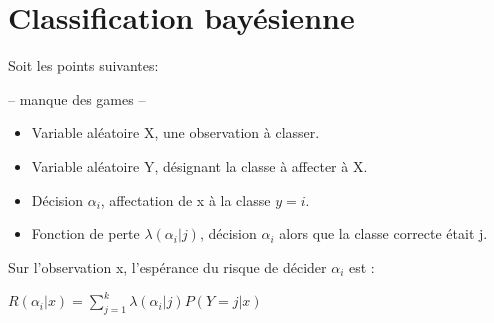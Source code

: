 \documentclass{article}
\begin{document}
\section{Classification bayésienne}

Soit les points suivantes:

-- manque des games --

\begin{itemize}
\item Variable aléatoire X, une observation à classer.
\item Variable aléatoire Y, désignant la classe à affecter à X.
\item Décision $\alpha_i$, affectation de x à la classe $y = i$.
\item Fonction de perte $\lambda(\alpha_i | j)$, décision $\alpha_i$ alors que la classe correcte était j.
\end{itemize}

Sur l'observation x, l'espérance du risque de décider $\alpha_i$ est : 

$ R(\alpha_i | x) = \sum_{j = 1}^{k} \lambda(\alpha_i | j) P(Y = j | x) $
\end{document}
